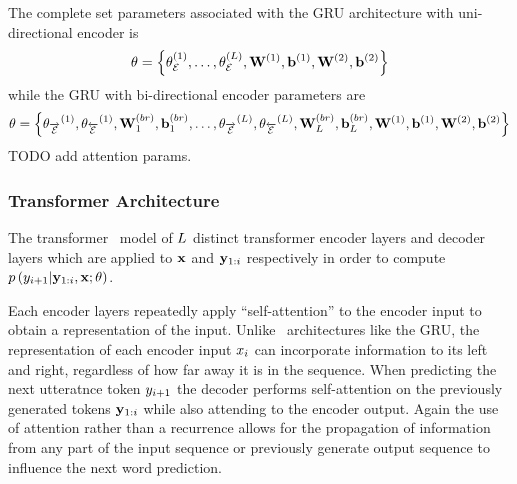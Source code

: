     The complete set parameters associated with the GRU architecture 
    with uni-directional encoder is
    \[ \theta = \left\{ \theta_\mathcal{E}^{(1)},
    \ldots, \theta_\mathcal{E}^{(L)}, 
    \mathbf{W}^{(1)}, \mathbf{b}^{(1)}, \mathbf{W}^{(2)}, \mathbf{b}^{(2)}
    \right\}  \]
    while the GRU
    with bi-directional encoder parameters are
    \[ \theta = \left\{ {\theta_{\overrightarrow{\mathcal{E}}}}^{(1)}, {\theta_{\overleftarrow{\mathcal{E}}}}^{(1)},
            \mathbf{W}^{(br)}_1, \mathbf{b}^{(br)}_1,
    \ldots, {\theta_{\overrightarrow{\mathcal{E}}}}^{(L)}, {\theta_{\overleftarrow{\mathcal{E}}}}^{(L)},
    \mathbf{W}^{(br)}_{L}, \mathbf{b}^{(br)}_{L}, \mathbf{W}^{(1)}, \mathbf{b}^{(1)}, \mathbf{W}^{(2)}, \mathbf{b}^{(2)}
    \right\}  \]
    TODO add attention params.
    

\subsubsection{Transformer Architecture}

The transformer \sequencetosequence~model of $L$ 
distinct transformer encoder
layers and decoder layers which are applied to $\mathbf{x}$ and $\mathbf{y}_{1:i}$
respectively in order to compute $p\left(y_{i+1}|\mathbf{y}_{1:i},\mathbf{x};\theta\right)$. 

Each encoder layers repeatedly apply ``self-attention'' to the encoder
input to obtain a representation of the input. Unlike 
\recurrentneuralnetwork~architectures like the GRU, the representation 
of each encoder input $x_i$ can incorporate information to its left
and right, regardless of how far away it is in the sequence.
When predicting the next utteratnce token $y_{i+1}$ 
the decoder performs self-attention on the previously generated tokens
$\mathbf{y}_{1:i}$ while also attending to the encoder output. Again
the use of attention rather than a recurrence allows for the propagation
of information from any part of the input sequence or previously generate output sequence to influence the next word prediction. 

